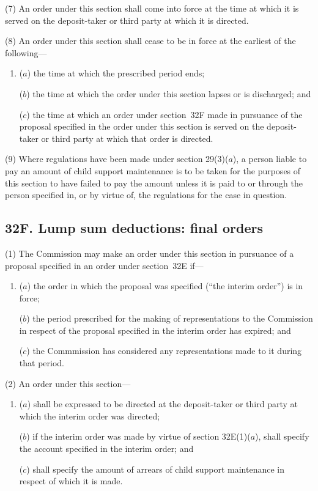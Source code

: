 \documentclass[12pt,a4paper]{article}
\begin{document}
(7) An order under this section shall come into force at the time at which it is served on the deposit-taker or third party at which it is directed.

(8) An order under this section shall cease to be in force at the earliest of the following---
\begin{enumerate}\item[]
($a$)
the time at which the prescribed period ends;

($b$)
the time at which the order under this section lapses or is discharged; and

($c$)
the time at which an order under section~32F made in pursuance of the proposal specified in the order under this section is served on the deposit-taker or third party at which that order is directed.
\end{enumerate}

\begin{sloppypar}
(9) Where regulations have been made under section 29(3)($a$), a person liable to pay an amount of child support maintenance is to be taken for the purposes of this section to have failed to pay the amount unless it is paid to or through the person specified in, or by virtue of, the regulations for the case in question.
\end{sloppypar}

\subsection{32F. Lump sum deductions: final orders}

(1) The Commission may make an order under this section in pursuance of a proposal specified in an order under section~32E if---
\begin{enumerate}\item[]
($a$)
the order in which the proposal was specified (“the interim order”) is in force;

($b$)
the period prescribed for the making of representations to the Commission in respect of the proposal specified in the interim order has expired; and

($c$)
the Commmission has considered any representations made to it during that period.
\end{enumerate}

(2) An order under this section---
\begin{enumerate}\item[]
($a$)
shall be expressed to be directed at the deposit-taker or third party at which the interim order was directed;

\begin{sloppypar}
($b$)
if the interim order was made by virtue of section 32E(1)($a$), shall specify the account specified in the interim order; and
\end{sloppypar}

($c$)
shall specify the amount of arrears of child support maintenance in respect of which it is made.
\end{enumerate}
\end{document}
